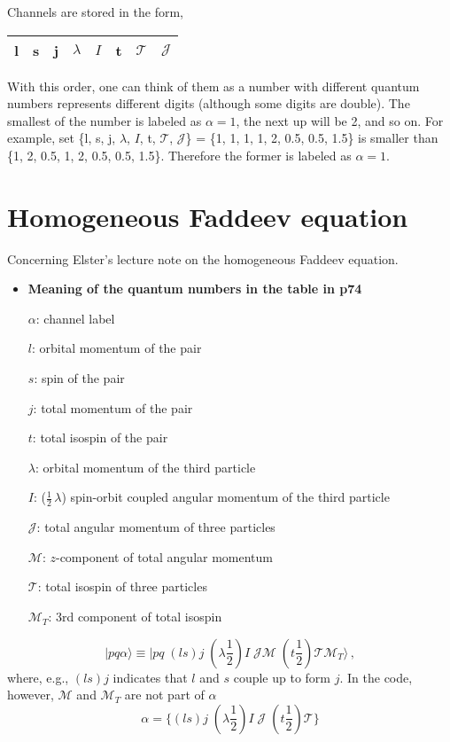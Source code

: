 \documentclass[11pt,aps]{revtex4}
\begin{document}
Channels are stored in the form,
\begin{center}
\begin{tabular}{ | c  c  c c c c c c|}
\hline
l & s & j & $\lambda$ & $I$ & t & $\mathcal{T}$ & $\mathcal{J}$ \\
\hline
\end{tabular}
\end{center}

With this order, one can think of them as a number with different quantum
numbers represents different digits (although some digits are double). The smallest of the number is labeled as
$\alpha = 1$, the next up will be 2, and so on. For example, set \{l, s, j, $\lambda$, $I$, t, $\mathcal{T}$, $\mathcal{J}$\} = \{1, 1, 1, 1, 2, 0.5, 0.5,
1.5\} is smaller than \{1, 2, 0.5, 1, 2, 0.5, 0.5, 1.5\}. Therefore the former
is labeled as $\alpha = 1$.


\section{Homogeneous Faddeev equation}

Concerning Elster's lecture note on the homogeneous Faddeev equation.

\begin{itemize}
\item \textbf{Meaning of the quantum numbers in the table in p74}

  $\alpha$: channel label

  $l$: orbital momentum of the pair

  $s$: spin of the pair

  $j$: total momentum of the pair

  $t$: total isospin of the pair

  $\lambda$: orbital momentum of the third particle

  $I$: ($\frac{1}{2}\, \lambda$) spin-orbit coupled angular momentum of the third particle

  $\mathcal{J}$: total angular momentum of three particles

  $\mathcal{M}$: $z$-component of total angular momentum

  $\mathcal{T}$: total isospin of three particles

  $\mathcal{M}_T$: 3rd component of total isospin


\end{itemize}
\begin{equation}
  | p q \alpha \rangle \equiv | pq\; (ls)j\; (\lambda \frac{1}{2}) I\; \mathcal{J} \mathcal{M}\; (t \frac{1}{2}) \mathcal{T} \mathcal{M}_T \rangle \, ,
\end{equation}
where, e.g., $(ls) j$ indicates that $l$ and $s$ couple up to form $j$. In the code, however, $\mathcal{M}$ and $\mathcal{M}_T$ are not part of $\alpha$
\begin{equation}
  \alpha = \{(ls)j\; (\lambda \frac{1}{2}) I\; \mathcal{J}\; (t \frac{1}{2}) \mathcal{T} \} \label{eqn-defalpha}
\end{equation}
\end{document}
